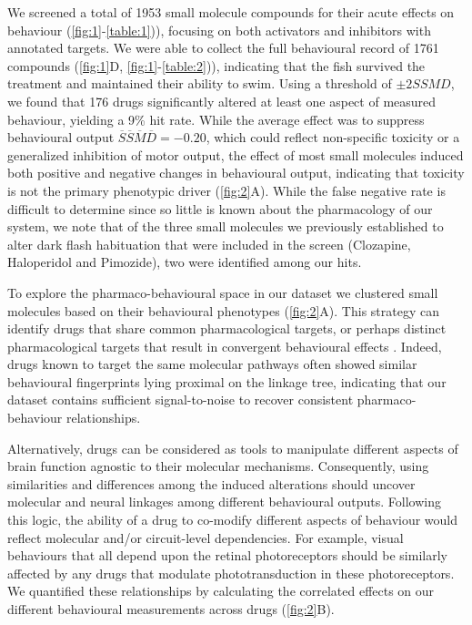 \documentclass[9pt,lineno]{RandlettLab_elife}
\begin{document}
We screened a total of 1953 small molecule compounds for their acute effects on behaviour (\autoref{fig:1}-\autoref{table:1})), focusing on both activators and  inhibitors  with annotated targets. We were able to collect the full behavioural record of 1761 compounds  (\autoref{fig:1}D, \autoref{fig:1}-\autoref{table:2})), indicating that the fish survived the treatment and maintained their ability to swim. Using a threshold of \(\pm 2 \mathit{SSMD}\), we found that 176 drugs significantly altered at least one aspect of measured behaviour, yielding a 9\% hit rate. While the average effect was to suppress behavioural output \(\overline S \overline S \overline M \overline D = -0.20\), which could reflect non-specific toxicity or a generalized inhibition of motor output, the effect of most small molecules  induced both positive and negative changes in behavioural output, indicating that toxicity is not the primary phenotypic driver (\autoref{fig:2}A). While the false negative rate is difficult to determine since so little is known about the pharmacology of our system, we note that of the three small molecules we previously established to alter dark flash habituation that were included in the screen (Clozapine, Haloperidol and Pimozide), two were identified among our hits. 

To explore the pharmaco-behavioural space in our dataset we clustered small molecules  based on their behavioural phenotypes (\autoref{fig:2}A). This strategy can identify drugs that share common pharmacological targets, or perhaps distinct pharmacological targets that result in convergent behavioural effects \cite{Bruni2016-nq, Rihel2010-pj}. Indeed, drugs known to target the same molecular pathways often showed similar behavioural fingerprints lying proximal on the linkage tree, indicating that our dataset contains sufficient signal-to-noise to recover consistent pharmaco-behaviour relationships. 

Alternatively, drugs can be considered  as tools to manipulate different aspects of brain function agnostic to their molecular mechanisms. Consequently,  using similarities and differences among the induced alterations should uncover molecular and neural linkages among different behavioural outputs. Following this logic, the ability of a drug to co-modify different aspects of behaviour would reflect molecular and/or circuit-level dependencies. For example, visual behaviours that all depend upon the retinal photoreceptors should be similarly affected by any drugs that modulate phototransduction in these photoreceptors. We quantified these relationships by calculating the correlated effects on our different behavioural measurements across drugs (\autoref{fig:2}B). 
\end{document}
